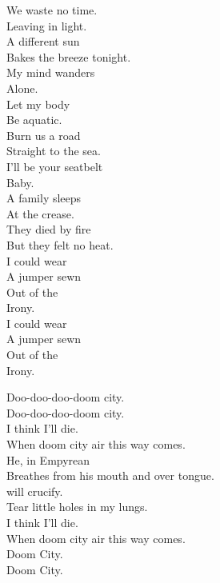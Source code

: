 We waste no time. \\
Leaving in light. \\
A different sun \\
Bakes the breeze tonight. \\

My mind wanders \\
Alone. \\
Let my body \\
Be aquatic. \\

Burn us a road \\
Straight to the sea. \\
I'll be your seatbelt \\
Baby. \\

A family sleeps \\
At the crease. \\
They died by fire \\
But they felt no heat. \\
I could wear \\
A jumper sewn \\
Out of the \\
Irony. \\

I could wear \\
A jumper sewn \\
Out of the \\
Irony. \\




Doo-doo-doo-doom city. \\
Doo-doo-doo-doom city. \\

I think I'll die. \\
When doom city air this way comes. \\
He, in Empyrean \\
Breathes from his mouth and over tongue. \\
 will crucify. \\
Tear little holes in my lungs. \\
I think I'll die. \\
When doom city air this way comes. \\

Doom City. \\
Doom City. \\

